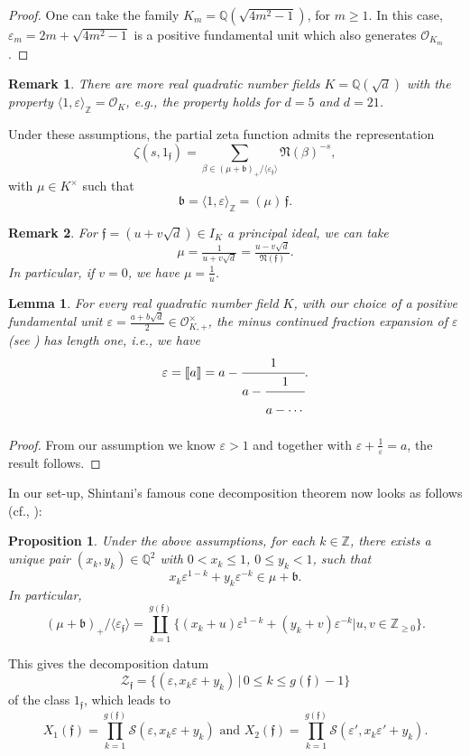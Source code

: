 \documentclass[11pt, a4paper]{amsart}
\newcommand{\ep}{\varepsilon}
\newcommand{\eq}[1]{\begin{equation}#1\end{equation}}
\theoremstyle{plain}
\newtheorem{proposition}{Proposition}[section]
\newtheorem{lemma}{Lemma}[section]
\newtheorem{remark}{Remark}[section]
\numberwithin{equation}{section}
\begin{document}
\begin{proof}
One can take the family $K_m = \mathbb Q(\sqrt{4m^2-1})$, for $m \geq 1$. In this case, $\ep_m = 2m+\sqrt{4m^2-1}$ is a positive fundamental unit which also generates $\mathcal O_{K_m}$.
\end{proof}
\begin{remark}
There are more real quadratic number fields $K=\mathbb Q(\sqrt{d})$ with the property $\langle 1,\ep\rangle_\mathbb Z = \mathcal O_K$, e.g., the property holds for $d =5$ and $d=21$.
\end{remark}
\noindent Under these assumptions, the partial zeta function admits the representation \eq{\zeta(s,1_\mathfrak f) = \sum_{\beta \in (\mu+\mathfrak b)_+ / \langle \ep_\mathfrak f \rangle} \mathfrak N (\beta)^{-s},} with $\mu \in K^\times$ such that \eq{\mathfrak b = \langle 1,\ep\rangle_\mathbb Z = (\mu) \, \mathfrak f.}
\begin{remark}
For $\mathfrak f = (u+v\sqrt{d}) \in I_K$ a principal ideal, we can take \eq{\mu = \tfrac{1}{u+v\sqrt{d}}=\tfrac{u-v\sqrt{d}}{\mathfrak N (\mathfrak f)}.} In particular, if $v=0$, we have $\mu = \frac 1 u$.
\end{remark}
\begin{lemma}
For every real quadratic number field $K$, with our choice of a positive fundamental unit $\ep = \tfrac{a+b\sqrt{d}}{2} \in \mathcal O_{K,+}^\times$, the minus continued fraction expansion of $\ep$ (see \cite{zagier2013zetafunktionen}) has length one, i.e., we have \eq{\ep = \llbracket a \rrbracket=
a-\cfrac{1}{a-\cfrac{1}{a-
  \cdots\vphantom{\cfrac{1}{1}} }}.}
\end{lemma}
\begin{proof}
From our assumption we know $\ep > 1$ and together with $\ep + \tfrac1 \ep = a$, the result follows.
\end{proof}
\noindent In our set-up, Shintani's famous cone decomposition theorem now looks as follows (cf., \cite{yamamoto2008kronecker}):
\begin{proposition}
\label{decomposition}
Under the above assumptions, for each $k \in \mathbb Z$, there exists a unique pair $(x_k,y_k) \in \mathbb Q^2$ with $0<x_k\leq1$,  $0 \leq y_k<1$, such that \eq{x_k \ep^{1-k} + y_k \ep^{-k} \in \mu+\mathfrak b.}
In particular, \eq{(\mu+\mathfrak b)_+ / \langle \ep_\mathfrak f \rangle = \coprod_{k=1}^{g(\mathfrak f)}\{ (x_k+u)\ep^{1-k}+(y_k+v)\ep^{-k} | u,v \in \mathbb Z_{\geq 0}\}.}
\end{proposition} 
\noindent This gives the decomposition datum \eq{\mathcal Z_\mathfrak f = \{(\ep,x_k \ep + y_k) \, \vert \, 0\leq k \leq g(\mathfrak f)-1\}} of the class $1_\mathfrak f$, which leads to \eq{ \label{ShintaniValues2}X_1(\mathfrak f) = \prod_{k=1}^{g(\mathfrak f)} \mathcal S(\ep,x_k \ep + y_k) \text{ and } X_2(\mathfrak f) = \prod_{k=1}^{g(\mathfrak f)} \mathcal S(\ep',x_k \ep' + y_k).}
\end{document}

